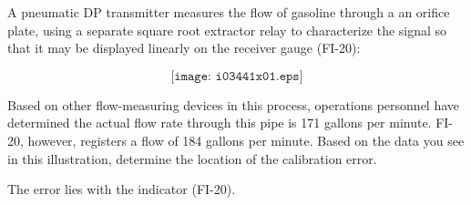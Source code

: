 

A pneumatic DP transmitter measures the flow of gasoline through a an orifice plate, using a separate square root extractor relay to characterize the signal so that it may be displayed linearly on the receiver gauge (FI-20):

$$\texttt{[image: i03441x01.eps]}$$

Based on other flow-measuring devices in this process, operations personnel have determined the actual flow rate through this pipe is 171 gallons per minute.  FI-20, however, registers a flow of 184 gallons per minute.  Based on the data you see in this illustration, determine the location of the calibration error.







The error lies with the indicator (FI-20).










